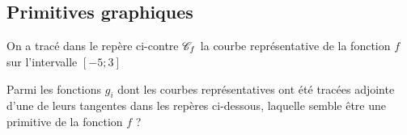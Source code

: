 \documentclass[oneside,12pt]{book}          %
\begin{document}
\subsection{Primitives graphiques}
\begin{minipage}{0.6\linewidth}\restoreskip
    On a tracé dans le repère ci-contre ${\mathscr{C}}_f$ la courbe représentative de la fonction $f$ sur l'intervalle $[-5;3]$

    Parmi les fonctions $g_i$ dont les courbes représentatives ont été tracées adjointe d'une de leurs tangentes dans les repères ci-dessous, laquelle semble être une primitive de la fonction $f$ ?
\end{minipage}\hspace{3mm}
\begin{minipage}{0.45\linewidth}
\end{minipage}
\end{document}

